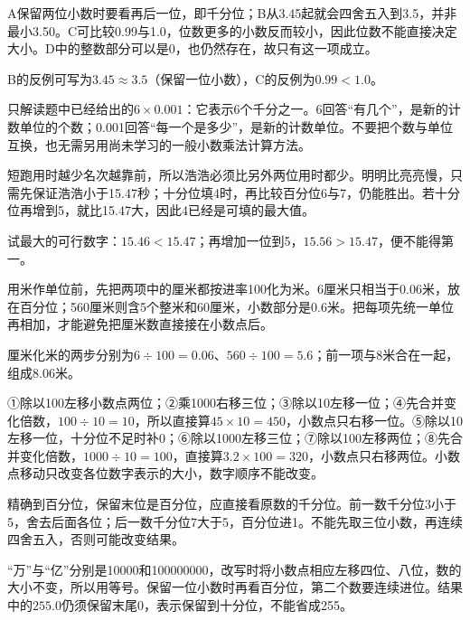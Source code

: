\documentclass[multi=snippet,border=0pt]{standalone}
\newenvironment{snippet}[3]{\begin{minipage}{#1bp}\color{answerred}\fontsize{#2}{#3}\selectfont\raggedright}{\end{minipage}}
\begin{document}
\begin{snippet}{505}{11.5}{14}A保留两位小数时要看再后一位，即千分位；B从3.45起就会四舍五入到3.5，并非最小3.50。C可比较0.99与1.0，位数更多的小数反而较小，因此位数不能直接决定大小。D中的整数部分可以是0，也仍然存在，故只有这一项成立。\par B的反例可写为\(3.45\approx3.5\)（保留一位小数），C的反例为\(0.99<1.0\)。\end{snippet}
\begin{snippet}{505}{11.5}{14}只解读题中已经给出的\(6\times0.001\)：它表示6个千分之一。6回答“有几个”，是新的计数单位的个数；0.001回答“每一个是多少”，是新的计数单位。不要把个数与单位互换，也无需另用尚未学习的一般小数乘法计算方法。\end{snippet}
\begin{snippet}{505}{11.5}{14}短跑用时越少名次越靠前，所以浩浩必须比另外两位用时都少。明明比亮亮慢，只需先保证浩浩小于15.47秒；十分位填4时，再比较百分位6与7，仍能胜出。若十分位再增到5，就比15.47大，因此4已经是可填的最大值。\par 试最大的可行数字：\(15.46<15.47\)；再增加一位到5，\(15.56>15.47\)，便不能得第一。\end{snippet}
\begin{snippet}{505}{11.5}{14}用米作单位前，先把两项中的厘米都按进率100化为米。6厘米只相当于0.06米，放在百分位；560厘米则含5个整米和60厘米，小数部分是0.6米。把每项先统一单位再相加，才能避免把厘米数直接接在小数点后。\par 厘米化米的两步分别为\(6\div100=0.06\)、\(560\div100=5.6\)；前一项与8米合在一起，组成8.06米。\end{snippet}
\begin{snippet}{505}{11.5}{14}①除以100左移小数点两位；②乘1000右移三位；③除以10左移一位；④先合并变化倍数，\(100\div10=10\)，所以直接算\(45\times10=450\)，小数点只右移一位。⑤除以10左移一位，十分位不足时补0；⑥除以1000左移三位；⑦除以100左移两位；⑧先合并变化倍数，\(1000\div10=100\)，直接算\(3.2\times100=320\)，小数点只右移两位。小数点移动只改变各位数字表示的大小，数字顺序不能改变。\end{snippet}
\begin{snippet}{505}{11.5}{14}精确到百分位，保留末位是百分位，应直接看原数的千分位。前一数千分位3小于5，舍去后面各位；后一数千分位7大于5，百分位进1。不能先取三位小数，再连续四舍五入，否则可能改变结果。\end{snippet}
\begin{snippet}{505}{11.5}{14}“万”与“亿”分别是10000和100000000，改写时将小数点相应左移四位、八位，数的大小不变，所以用等号。保留一位小数时再看百分位，第二个数要连续进位。结果中的\(255.0\)仍须保留末尾0，表示保留到十分位，不能省成255。\end{snippet}
\end{document}

